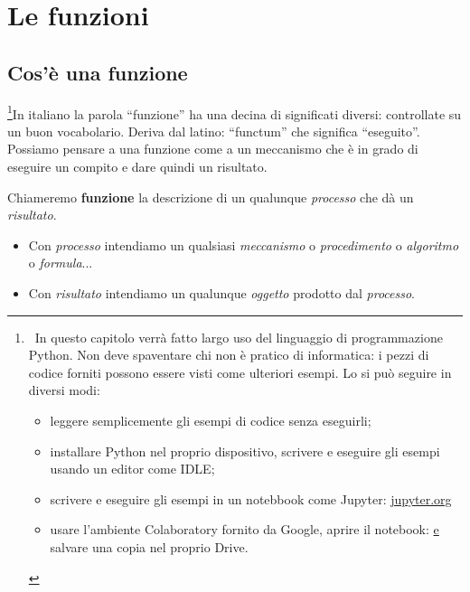 



\chapter{Le funzioni}

\section{Cos'è una funzione}
\label{sec:funzioni2_cose}

\footnote{~In questo capitolo verrà fatto largo uso del linguaggio di 
programmazione Python. 
Non deve spaventare chi non è pratico di informatica: i pezzi di codice 
forniti possono essere visti come ulteriori esempi. 
Lo si può seguire in diversi modi: 
\begin{itemize} [nosep]
\item leggere semplicemente gli esempi di codice senza eseguirli;
\item installare Python nel proprio dispositivo, scrivere e eseguire 
gli esempi usando un editor come IDLE;
\item scrivere e eseguire gli esempi in un notebbook come Jupyter: 
\href{https://jupyter.org/}{jupyter.org}
\item usare l'ambiente Colaboratory fornito da Google, aprire il notebook:
\href{
https://colab.research.google.com/drive/1sP4GdFmKI1sLam09tvcXuPHA8XM3muWM}
e salvare una copia nel proprio Drive.
\end{itemize}
}In italiano la parola  ``funzione'' ha una decina di significati 
diversi: 
controllate su un buon vocabolario. Deriva dal latino:  ``functum'' che 
significa  ``eseguito''.
Possiamo pensare a una funzione come a un meccanismo che è in grado di 
eseguire un compito e dare quindi un risultato.

\begin{definizione}
Chiameremo \textbf{funzione} la descrizione di un qualunque 
\emph{processo} che dà un \emph{risultato}.
\end{definizione}

\begin{itemize} [noitemsep]
\item Con \emph{processo} intendiamo un qualsiasi \emph{meccanismo} o 
\emph{procedimento} o \emph{algoritmo} o \emph{formula}...
\item Con \emph{risultato} intendiamo un qualunque \emph{oggetto} prodotto 
dal \emph{processo}.
\end{itemize}

